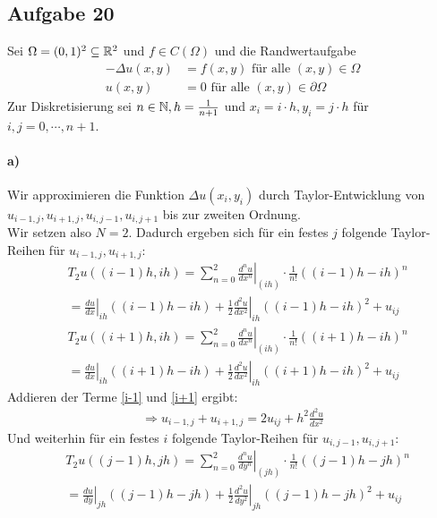 \subsection*{Aufgabe 20}
Sei $\Omega=(0,1)^2 \subseteq \mathbb R^2$ und $f \in C(\Omega)$ und die Randwertaufgabe
\begin{align*}
-\Delta u(x,y)&=f(x,y) \text{ für alle }(x,y) \in \Omega\\
u(x,y)&=0 \text{ für alle } (x,y) \in \partial\Omega
\end{align*}
Zur Diskretisierung sei $n\in \mathbb N, h=\frac{1}{n+1}$ und $x_i=i \cdot h, y_i=j\cdot h$ für $i,j=0, \cdots, n+1$.
\paragraph*{a)}
Wir approximieren die Funktion $\Delta u(x_i,y_i)$ durch Taylor-Entwicklung von $u_{i-1,j}, u_{i+1,j}, u_{i,j-1}, u_{i,j+1}$ bis zur zweiten Ordnung.\\
\newline
Wir setzen also $N=2$. Dadurch ergeben sich für ein festes $j$ folgende Taylor-Reihen für $u_{i-1,j}, u_{i+1,j}$:
\begin{align}
&T_2 u((i-1)h, ih)=\sum_{n=0}^2 \left. \frac{d^n u}{dx^n} \right|_{(ih)} \cdot \frac{1}{n!}((i-1)h-ih)^n\\ &=\left.\frac{du}{dx}\right |_{ih} ((i-1)h-ih)+\left.\frac{1}{2}\frac{d^2u}{dx^2}\right|_{ih}((i-1)h-ih)^2+u_{ij}\label{i-1}\end{align}
\begin{align}
&T_2 u((i+1)h, ih)=\sum_{n=0}^2 \left. \frac{d^n u}{dx^n} \right|_{(ih)} \cdot \frac{1}{n!}((i+1)h-ih)^n\\ &=\left.\frac{du}{dx}\right |_{ih} ((i+1)h-ih)+\left.\frac{1}{2}\frac{d^2u}{dx^2}\right|_{ih}((i+1)h-ih)^2+u_{ij}\label{i+1}
\end{align}
Addieren der Terme \eqref{i-1} und \eqref{i+1} ergibt:
\begin{align*}
\Rightarrow u_{i-1,j}+u_{i+1,j}=2u_{ij} + h^2 \frac{d^2u}{dx^2}
\end{align*}
Und weiterhin für ein festes $i$ folgende Taylor-Reihen für $u_{i,j-1}, u_{i,j+1}$:
\begin{align}
&T_2 u((j-1)h, jh)=\sum_{n=0}^2 \left. \frac{d^n u}{dy^n} \right|_{(jh)} \cdot \frac{1}{n!}((j-1)h-jh)^n\\ &=\left.\frac{du}{dy}\right |_{jh} ((j-1)h-jh)+\left.\frac{1}{2}\frac{d^2u}{dy^2}\right|_{jh}((j-1)h-jh)^2+u_{ij}\label{j-1}\end{align}
